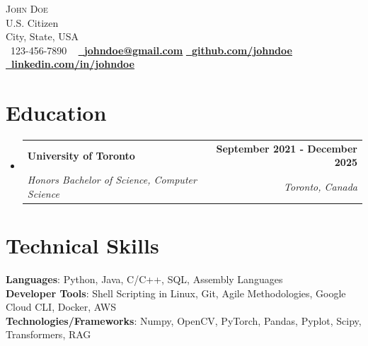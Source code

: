 \documentclass[letterpaper,11pt]{article}
\makeatletter
\let\oldhref\href
\renewcommand{\href}[2]{\oldhref{#1}{\bfseries#2}}
\newcommand{\resumeSubheading}[4]{
  \vspace{-2pt}\item
    \begin{tabular*}{1.0\textwidth}[t]{l@{\extracolsep{\fill}}r}
      \textbf{#1} & \textbf{\small #2} \\
      \textit{\small#3} & \textit{\small #4} \\
    \end{tabular*}\vspace{-7pt}
}
\newcommand{\resumeSubHeadingListStart}{\begin{itemize}[leftmargin=0.0in, label={}]}
\newcommand{\resumeSubHeadingListEnd}{\end{itemize}}
\makeatother
\begin{document}

\begin{center}
    {\Huge \scshape John Doe} \\ \vspace{1pt}
    U.S. Citizen \\ \vspace{1pt}
    City, State, USA \\ \vspace{1pt}
    \small \raisebox{-0.1\height}\faPhone\ 123-456-7890 ~ \href{mailto:johndoe@gmail.com}{\raisebox{-0.2\height} \faEnvelope\  \underline{johndoe@gmail.com}} \href{https://github.com/johndoe}{\raisebox{-0.2\height}\faGithub\ \underline{github.com/johndoe}} \href{https://www.linkedin.com/in/johndoe/}{\raisebox{-0.2\height}\faLinkedin\ \underline{linkedin.com/in/johndoe}} \\ 
    \vspace{-8pt}
\end{center}


\section{Education}
  \resumeSubHeadingListStart
    \resumeSubheading
      {University of Toronto}{September 2021 - December 2025}
      {Honors Bachelor of Science, Computer Science}{Toronto, Canada}
  \resumeSubHeadingListEnd
  \vspace{-20pt}
\section{Technical Skills}
\begin{itemize}[leftmargin=0.15in, label={}]
   \small{\item{
    \textbf{Languages}{: Python, Java, C/C++, SQL, Assembly Languages} \\
    \textbf{Developer Tools}{: Shell Scripting in Linux, Git, Agile Methodologies, Google Cloud CLI, Docker, AWS} \\
    \textbf{Technologies/Frameworks}{: Numpy, OpenCV, PyTorch, Pandas, Pyplot, Scipy, Transformers, RAG} \\
   }}
\end{itemize}
\vspace{-23pt}
\end{document}
